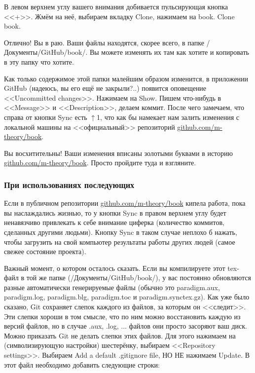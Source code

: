 \documentclass[11pt]{article}
\theoremstyle{remark}
\theoremstyle{definition}
\begin{document}
В левом верхнем углу вашего внимания добивается пульсирующая кнопка <<+>>. Жмём на неё, выбираем вкладку Clone, нажимаем на book. Clone book.

Отлично! Вы в раю. Ваши файлы находятся, скорее всего, в папке /Документы/GitHub/book/. Вы можете изменять их там как хотите и копировать в эту папку что хотите.

Как только содержимое этой папки малейшим образом изменится, в приложении GitHub (надеюсь, вы его ещё не закрыли?..) появится оповещение <<Uncommitted changes>>. Нажимаем на Show. Пишем что-нибудь в <<Message>> и <<Description>>, делаем коммит. После чего замечаем, что справа от кнопки Sync есть $\uparrow$1, что как бы намекает нам залить изменения с локальной машины на <<официальный>> репозиторий \href{https://github.com/m-theory/book}{\textcolor[rgb]{0.38,0.69,0.82}{github.com/m-theory/book}}.

Вы восхитительны! Ваши изменения вписаны золотыми буквами в историю \href{https://github.com/m-theory/book}{\textcolor[rgb]{0.38,0.69,0.82}{github.com/m-theory/book}}. Просто пройдите туда и взгляните.


\subsubsection{При использованиях последующих}

Если в публичном репозитории \href{https://github.com/m-theory/book}{\textcolor[rgb]{0.38,0.69,0.82}{github.com/m-theory/book}} кипела работа, пока вы наслаждались жизнью, то у кнопки Sync в правом верхнем углу будет ненавязчиво привлекать к себе внимание циферка (количество коммитов, сделанных другими людьми). Кнопку Sync в таком случае неплохо б нажать, чтобы загрузить на свой компьютер результаты работы других людей (самое свежее состояние проекта).

Важный момент, о котором осталось сказать. Если вы компилируете этот tex-файл в той же папке (/Документы/GitHub/book/), у вас постоянно обновляются разные автоматически генерируемые файлы (обычно это paradigm.aux, paradigm.log, paradigm.blg, paradigm.toc и paradigm.synctex.gz). Как уже было сказано, Git сохраняет слепок каждого из файлов, за которым он <<следит>>. Эти слепки хороши в том смысле, что по ним можно восстановить каждую из версий файлов, но в случае .aux, .log, ... файлов они просто засоряют ваш диск. Можно приказать Git не делать слепки этих файлов.
Для этого нажимаем на (символизирующую настройки) шестерёнку, выбираем <<Repository settings>>. Выбираем Add a default .gitignore file, НО НЕ нажимаем Update. В этот файл необходимо добавить следующие строки:
\end{document}
